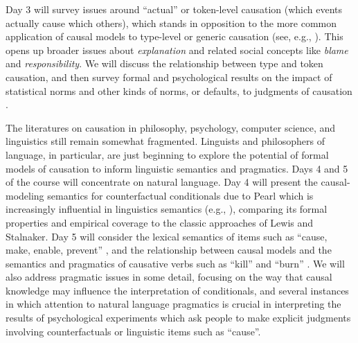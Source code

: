 \documentclass[english]{article}
\begin{document}

Day 3 will survey issues around ``actual'' or token-level causation (which events actually cause which others), which stands in opposition to the more common application of causal models to type-level or generic causation (see, e.g., \citealt{halpernpearl05a,halpernpearl05b}). This opens up broader issues about \emph{explanation} and related social concepts like \emph{blame} and \emph{responsibility}. We will discuss the relationship between type and token causation, and then survey formal and psychological results on the impact of statistical norms and other kinds of norms, or defaults, to judgments of causation \citep{halpern2015graded,Icard2017}.

The literatures on causation in philosophy, psychology, computer science, and linguistics still remain somewhat fragmented. Linguists and philosophers of language, in particular, are just beginning to explore the potential of formal models of causation to inform linguistic semantics and pragmatics. Days 4 and 5 of the course will concentrate on natural language. Day 4 will present the causal-modeling semantics for counterfactual conditionals due to Pearl which is increasingly influential in linguistics semantics (e.g., \citealt{pearl00,schulz07,sloman05b,deghanietal12,kaufmann13,lassiter17b,lassiter17c}), comparing its formal properties and empirical coverage to the classic approaches of Lewis and Stalnaker. Day 5 will consider the lexical semantics of items such as ``cause, make, enable, prevent'' \citep{wolff03,sloman09,nadathur2020causal,gerstenberg21}, and the relationship between causal models and the semantics and pragmatics of causative verbs such as ``kill'' and ``burn'' \citep{mccawley1978conversational,levin95}.  We will also address pragmatic issues in some detail, focusing on the way that causal knowledge may influence the interpretation of conditionals, and several instances in which attention to natural language pragmatics is crucial in interpreting the results of psychological experiments which ask people to make explicit judgments involving counterfactuals or linguistic items such as ``cause''.
\end{document}
